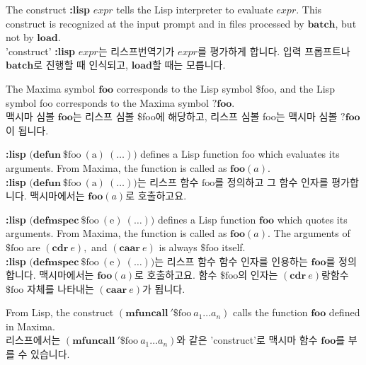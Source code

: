 \documentclass[12pt]{article}
\begin{document}

The construct {\bf :lisp} $\mathit{expr}$ tells the Lisp interpreter 
to evaluate $\mathit{expr}$.
This construct is recognized at the input prompt and in files processed by $\mathbf{batch}$,
but not by $\mathbf{load}$. \\
'construct' {\bf :lisp} $\mathit{expr}$는 리스프번역기가 $\mathit{expr}$를 평가하게 합니다.
입력 프롭프트나  $\mathbf{batch}$로 진행할 때 인식되고, $\mathbf{load}$할 때는 모릅니다.

The Maxima symbol $\mathbf{foo}$ corresponds to the Lisp symbol \$foo,
and the Lisp symbol foo corresponds to the Maxima symbol $\mathbf{?foo}$. \\
맥시마 심볼 $\mathbf{foo}$는 리스프 심볼 \$foo에 해당하고, 리스프 심볼 foo는
맥시마 심볼 $\mathbf{?foo}$이 됩니다.

{\bf :lisp} $\mathrm{(}\mathbf{defun\ } \mathrm{\$foo\ (a)\ (\ldots))}$
defines a Lisp function $\mathrm{foo}$ which evaluates its arguments.
From Maxima, the function is called as $\mathbf{foo}(a)$. \\
{\bf :lisp} $\mathrm{(}\mathbf{defun\ } \mathrm{\$foo\ (a)\ (\ldots))}$는
리스프 함수 $\mathrm{foo}$를 정의하고 그 함수 인자를 평가합니다. 
맥시마에서는 $\mathbf{foo}(a)$로 호출하고요.

{\bf :lisp} $\mathrm{(}\mathbf{defmspec\ } \mathrm{\$foo\ (e)\ (\ldots))}$
defines a Lisp function $\mathbf{foo}$ which quotes its arguments.
From Maxima, the function is called as $\mathbf{foo}(a)$.
The arguments of $\mathrm{\$foo}$ are $(\mathbf{cdr\ } e),$
and $(\mathbf{caar\ } e)$ is always $\mathrm{\$foo}$ itself. \\
{\bf :lisp} $\mathrm{(}\mathbf{defmspec\ } \mathrm{\$foo\ (e)\ (\ldots))}$는
리스프 함수 함수 인자를 인용하는 $\mathbf{foo}$를 정의합니다.
맥시마에서는 $\mathbf{foo}(a)$로 호출하고요.
함수 $\mathrm{\$foo}$의 인자는 $(\mathbf{cdr\ } e)$랑함수 $\mathrm{\$foo}$ 자체를
나타내는 $(\mathbf{caar\ } e)$가 됩니다.


From Lisp, the construct $(\mathbf{mfuncall\ '\$}\mathrm{foo\ }a_1 \ldots a_n)$ 
calls the function $\mathbf{foo}$ defined in Maxima. \\
리스프에서는 $(\mathbf{mfuncall\ '\$}\mathrm{foo\ }a_1 \ldots a_n)$와 같은 'construct'로
맥시마 함수 $\mathbf{foo}$를 부를 수 있습니다.
\end{document}
